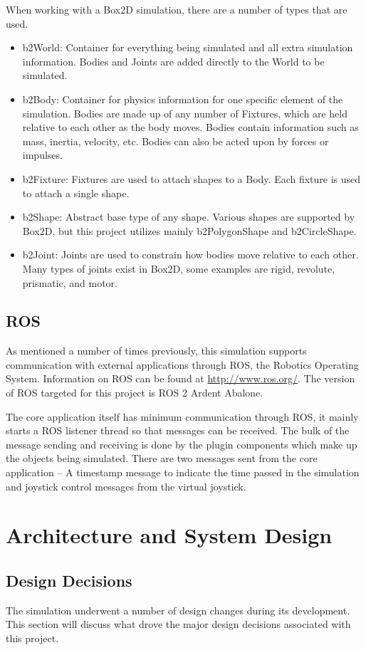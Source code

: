 When working with a Box2D simulation, there are a number of types that are used.
\begin{itemize}
	\item b2World: Container for everything being simulated and all extra simulation information. Bodies and Joints are added directly to the World to be simulated.
	\item b2Body: Container for physics information for one specific element of the simulation. Bodies are made up of any number of Fixtures, which are held relative to each other as the body moves. Bodies contain information such as mass, inertia, velocity, etc. Bodies can also be acted upon by forces or impulses.
	\item b2Fixture: Fixtures are used to attach shapes to a Body. Each fixture is used to attach a single shape.
	\item b2Shape: Abstract base type of any shape. Various shapes are supported by Box2D, but this project utilizes mainly b2PolygonShape and b2CircleShape.
	\item b2Joint: Joints are used to constrain how bodies move relative to each other. Many types of joints exist in Box2D, some examples are rigid, revolute, prismatic, and motor.
\end{itemize}

\subsection{ROS}
As mentioned a number of times previously, this simulation supports communication with external applications through ROS, the Robotics Operating System. Information on ROS can be found at \url{http://www.ros.org/}. The version of ROS targeted for this project is ROS 2 Ardent Abalone.

The core application itself has minimum communication through ROS, it mainly starts a ROS listener thread so that messages can be received. The bulk of the message sending and receiving is done by the plugin components which make up the objects being simulated. There are two messages sent from the core application -- A timestamp message to indicate the time passed in the simulation and joystick control messages from the virtual joystick.

\newpage
 \section{Architecture and System Design} 	
 \subsection{Design Decisions}
  	The simulation underwent a number of design changes during its development. This section will discuss what drove the major design decisions associated with this project.
